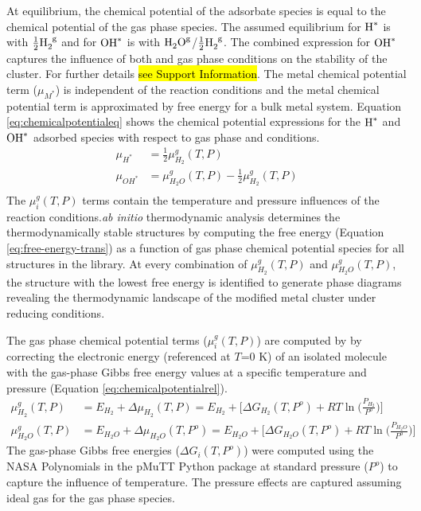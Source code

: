 \documentclass[journal=jctcce,manuscript=article]{achemso}
\begin{document}
At equilibrium, the chemical potential of the adsorbate species is equal to the chemical potential of the gas phase species. The assumed equilibrium for $\ce{H^{*}}$ is with $\frac{1}{2}\ce{H_{2}^{g}}$ and for $\ce{OH^{*}}$ is with $\ce{H_{2}O^{g}}$/$\frac{1}{2}\ce{H_{2}^{g}}$. The combined expression for $\ce{OH^{*}}$ captures the influence of both  and  gas phase conditions on the stability of the cluster. For further details \hl{see Support Information}. The metal chemical potential term ($\mu_{M^{*}}$) is independent of the reaction conditions and the metal chemical potential term is approximated by free energy for a bulk metal system. Equation \ref{eq:chemicalpotentialeq} shows the chemical potential expressions for the $\ce{H^{*}}$ and $\ce{OH^{*}}$ adsorbed species with respect to gas phase  and  conditions. \begin{equation}
    \begin{split}
        \mu_{H^{*}} &= \frac{1}{2} \mu_{H_{2}}^{g}(T,P) \\ 
        \mu_{OH^{*}} &= \mu_{H_{2}O}^{g}(T,P) - \frac{1}{2} \mu_{H_{2}}^{g}(T,P) \\
    \end{split}
    \label{eq:chemicalpotentialeq}
\end{equation}
The $\mu_{i}^{g}(T,P)$ terms contain the temperature and pressure influences of the reaction conditions.\textit{ab initio} thermodynamic analysis determines the thermodynamically stable structures by computing the free energy (Equation \ref{eq:free-energy-trans}) as a function of gas phase chemical potential species for all structures in the library. At every combination of $\mu_{H_{2}}^{g}(T,P)$ and $\mu_{H_{2}O}^{g}(T,P)$, the structure with the lowest free energy is identified to generate phase diagrams revealing the thermodynamic landscape of the modified metal cluster under reducing conditions. 

The gas phase chemical potential terms ($\mu_{i}^{g}(T,P)$) are computed by by correcting the electronic energy (referenced at $T$=0 K) of an isolated molecule with the gas-phase Gibbs free energy values at a specific temperature and pressure (Equation \ref{eq:chemicalpotentialrel}).
\begin{equation}
    \begin{split}
        \mu_{H_{2}}^{g}(T,P) &= E_{H_2} + \Delta \mu_{H_{2}}(T,P)  = E_{H_{2}} + \Big[ \Delta G_{H_{2}}(T,P^{o}) + RT \ln{\Big( \frac{P_{H_{2}}}{P^{o}} \Big)} \Big] \\  
        \mu_{H_{2}O}^{g}(T,P) &= E_{H_{2}O} + \Delta \mu_{H_{2}O}(T,P^{o}) =  E_{H_{2}O} + \Big[ \Delta G_{H_{2}O}(T,P^{o}) + RT \ln{\Big( \frac{P_{H_{2}O}}{P^{o}} \Big)} \Big]
    \end{split}
    \label{eq:chemicalpotentialrel}
\end{equation}
 The gas-phase Gibbs free energies ($\Delta G_{i}(T,P^{o})$) were computed using the NASA Polynomials\cite{Mcbride1993} in the pMuTT\cite{LYM2019106864} Python package at standard pressure ($P^{o}$) to capture the influence of temperature. The pressure effects are captured assuming ideal gas for the gas phase species. 
 
\end{document}

